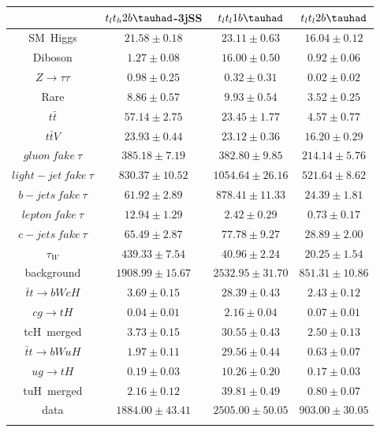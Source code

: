\centering
\begin{tabular}{cccc} \toprule\toprule
 & $t_lt_h2b\tauhad$-3jSS & $t_lt_l1b\tauhad$ & $t_lt_l2b\tauhad$\\\midrule
SM~Higgs & $21.58\pm0.18$ & $23.11\pm0.63$ & $16.04\pm0.12$\\
Diboson & $1.27\pm0.08$ & $16.00\pm0.50$ & $0.92\pm0.06$\\
$Z\to\tau\tau$ & $0.98\pm0.25$ & $0.32\pm0.31$ & $0.02\pm0.02$\\
Rare & $8.86\pm0.57$ & $9.93\pm0.54$ & $3.52\pm0.25$\\
$t\bar{t}$ & $57.14\pm2.75$ & $23.45\pm1.77$ & $4.57\pm0.77$\\
$t\bar{t}V$ & $23.93\pm0.44$ & $23.12\pm0.36$ & $16.20\pm0.29$\\
$gluon~fake~\tau$ & $385.18\pm7.19$ & $382.80\pm9.85$ & $214.14\pm5.76$\\
$light-jet~fake~\tau$ & $830.37\pm10.52$ & $1054.64\pm26.16$ & $521.64\pm8.62$\\
$b-jets~fake~\tau$ & $61.92\pm2.89$ & $878.41\pm11.33$ & $24.39\pm1.81$\\
$lepton~fake~\tau$ & $12.94\pm1.29$ & $2.42\pm0.29$ & $0.73\pm0.17$\\
$c-jets~fake~\tau$ & $65.49\pm2.87$ & $77.78\pm9.27$ & $28.89\pm2.00$\\
$\tau_{W}$ & $439.33\pm7.54$ & $40.96\pm2.24$ & $20.25\pm1.54$\\
background & $1908.99\pm15.67$ & $2532.95\pm31.70$ & $851.31\pm10.86$\\\midrule
$\bar{t}t\to bWcH$ & $3.69\pm0.15$ & $28.39\pm0.43$ & $2.43\pm0.12$\\
$cg\to tH$ & $0.04\pm0.01$ & $2.16\pm0.04$ & $0.07\pm0.01$\\
tcH~merged & $3.73\pm0.15$ & $30.55\pm0.43$ & $2.50\pm0.13$\\
$\bar{t}t\to bWuH$ & $1.97\pm0.11$ & $29.56\pm0.44$ & $0.63\pm0.07$\\
$ug\to tH$ & $0.19\pm0.03$ & $10.26\pm0.20$ & $0.17\pm0.03$\\
tuH~merged & $2.16\pm0.12$ & $39.81\pm0.49$ & $0.80\pm0.07$\\\midrule
data & $1884.00\pm43.41$ & $2505.00\pm50.05$ & $903.00\pm30.05$\\
\bottomrule\bottomrule\\
\end{tabular}
